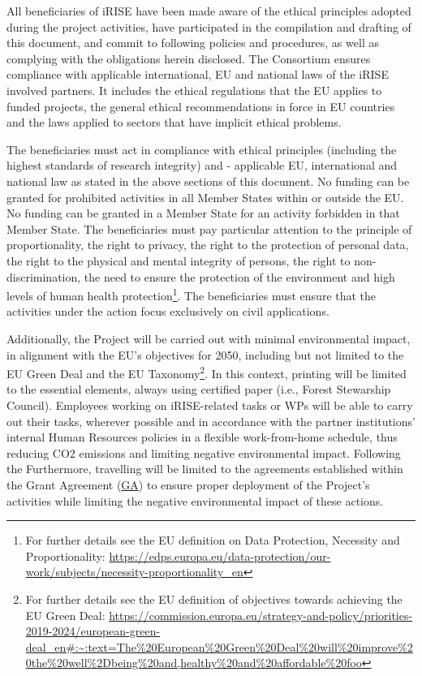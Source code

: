 \documentclass[
]{article}
\begin{document}
All beneficiaries of iRISE have been made aware of the ethical principles adopted during the project activities, have participated in the compilation and drafting of this document, and commit to following policies and procedures, as well as complying with the obligations herein disclosed. The Consortium ensures compliance with applicable international, EU and national laws of the iRISE involved partners. It includes the ethical regulations that the EU applies to funded projects, the general ethical recommendations in force in EU countries and the laws applied to sectors that have implicit ethical problems.

The beneficiaries must act in compliance with ethical principles (including the highest standards of research integrity) and - applicable EU, international and national law as stated in the above sections of this document. No funding can be granted for prohibited activities in all Member States within or outside the EU. No funding can be granted in a Member State for an activity forbidden in that Member State. The beneficiaries must pay particular attention to the principle of proportionality, the right to privacy, the right to the protection of personal data, the right to the physical and mental integrity of persons, the right to non-discrimination, the need to ensure the protection of the environment and high levels of human health protection\footnote{For further details see the EU definition on Data Protection, Necessity and Proportionality: \url{https://edps.europa.eu/data-protection/our-work/subjects/necessity-proportionality_en}}. The beneficiaries must ensure that the activities under the action focus exclusively on civil applications.

Additionally, the Project will be carried out with minimal environmental impact, in alignment with the EU's objectives for 2050, including but not limited to the EU Green Deal and the EU Taxonomy\footnote{For further details see the EU definition of objectives towards achieving the EU Green Deal: \href{https://commission.europa.eu/strategy-and-policy/priorities-2019-2024/european-green-deal_en\#:~:text=The\%20European\%20Green\%20Deal\%20will\%20improve\%20the\%20well\%2Dbeing\%20and,healthy\%20and\%20affordable\%20food}{https://commission.europa.eu/strategy-and-policy/priorities-2019-2024/european-green-deal\_en\#:\textasciitilde:text=The\%20European\%20Green\%20Deal\%20will\%20improve\%20the\%20well\%2Dbeing\%20and,healthy\%20and\%20affordable\%20foo}}. In this context, printing will be limited to the essential elements, always using certified paper (i.e., Forest Stewarship Council). Employees working on iRISE-related tasks or WPs will be able to carry out their tasks, wherever possible and in accordance with the partner institutions' internal Human Resources policies in a flexible work-from-home schedule, thus reducing CO2 emissions and limiting negative environmental impact. Following the Furthermore, travelling will be limited to the agreements established within the Grant Agreement (\href{https://charitede.sharepoint.com/:f:/r/sites/iRISE/Shared\%20Documents/General/Grant\%20Agreement/AMD-101094853-4_Nov2023?csf=1\&web=1\&e=IRbwUs}{GA}) to ensure proper deployment of the Project's activities while limiting the negative environmental impact of these actions.
\end{document}
